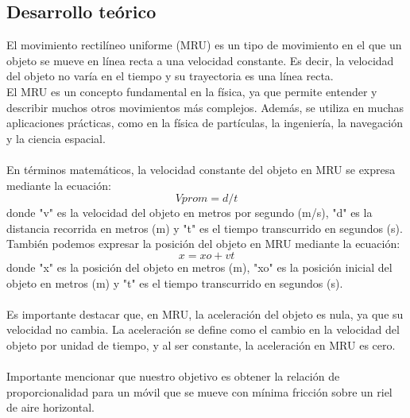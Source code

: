 \documentclass{article}
\begin{document}

\begin{multicols}{2}



\section*{Desarrollo teórico}\label{Desarrollo Teorico}                              	%

El movimiento rectilíneo uniforme (MRU) es un tipo de movimiento en el que un objeto se mueve en línea recta a una velocidad constante. Es decir, la velocidad del objeto no varía en el tiempo y su trayectoria es una línea recta.
\\

El MRU es un concepto fundamental en la física, ya que permite entender y describir muchos otros movimientos más complejos. Además, se utiliza en muchas aplicaciones prácticas, como en la física de partículas, la ingeniería, la navegación y la ciencia espacial.
\\
\\
En términos matemáticos, la velocidad constante del objeto en MRU se expresa mediante la ecuación:
\begin{equation}\label{Ec:1}
	Vprom = d/t
\end{equation}
donde "v" es la velocidad del objeto en metros por segundo (m/s), "d" es la distancia recorrida en metros (m) y "t" es el tiempo transcurrido en segundos (s).
\\
También podemos expresar la posición del objeto en MRU mediante la ecuación:
\begin{equation}\label{Ec:2}
	x = xo + vt
\end{equation}
donde "x" es la posición del objeto en metros (m), "xo" es la posición inicial del objeto en metros (m) y "t" es el tiempo transcurrido en segundos (s).
\\
\\
Es importante destacar que, en MRU, la aceleración del objeto es nula, ya que su velocidad no cambia. La aceleración se define como el cambio en la velocidad del objeto por unidad de tiempo, y al ser constante, la aceleración en MRU es cero.
\\
\\
Importante mencionar que nuestro objetivo es obtener la relación de proporcionalidad para un móvil que se mueve con mínima fricción sobre un riel de aire horizontal. 





\end{multicols}
\end{document}
